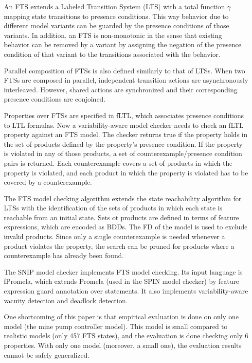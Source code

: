 \documentclass[11pt]{article}
\begin{document}
An FTS extends a Labeled Transition System (LTS) with a total function $\gamma$ mapping state transitions to presence conditions. This way behavior due to different model variants can be guarded by the presence conditions of those variants. In addition, an FTS is non-monotonic in the sense that existing behavior can be removed by a variant by assigning the negation of the presence condition of that variant to the transitions associated with the behavior.

Parallel composition of FTSs is also defined similarly to that of LTSs. When two FTSs are composed in parallel, independent transition actions are asynchronously interleaved. However, shared actions are synchronized and their corresponding presence conditions are conjoined. 

Properties over FTSs are specified in fLTL, which associates presence conditions to LTL formulas. Now a variability-aware model checker needs to check an fLTL property against an FTS model. The checker returns true if the property holds in the set of products defined by the property's presence condition. If the property is violated in any of those products, a set of counterexample/presence condition pairs is returned. Each counterexample covers a set of products in which the property is violated, and each product in which the property is violated  has to be covered by a counterexample.

The FTS model checking algorithm extends the state reachability algorithm for LTSs with the identification of the sets of products in which each state is reachable from an initial state. Sets ot products are defined in terms of feature expressions, which are encoded as BDDs. The FD of the model is used to exclude invalid products. Since only a single counterexample is needed whenever a product violates the property, the search can be pruned for products where a counterexample has already been found.

The SNIP model checker implements FTS model checking. Its input language is fPromela, which extends Promela (used in the SPIN model checker) by feature expression guard annotation over statements. It also implements variability-aware vacuity detection and deadlock detection.

One shortcoming of this paper is that empirical evaluation is done on only one model (the mine pump controller model). This model is small compared to realistic models (only 457 FTS states), and the evaluation is done checking only 6 properties. With only one model (moreover, a small one), the evaluation results cannot be safely generalized. 
\end{document}
